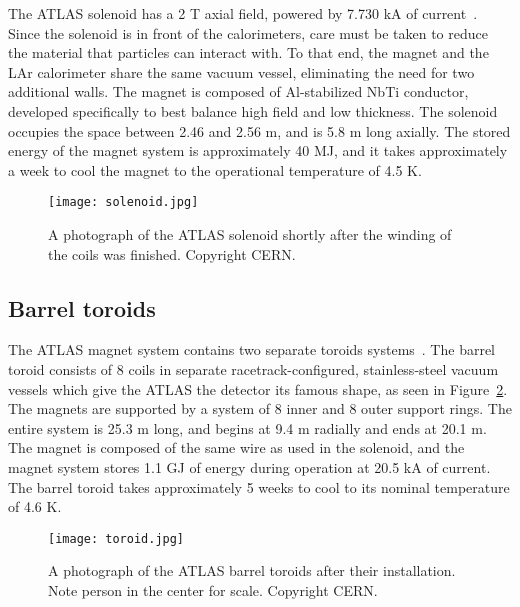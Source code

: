 The ATLAS solenoid has a 2 T axial field, powered by 7.730 kA of current~\cite{ATLASPaper}. Since the solenoid is in front of the calorimeters, care must be taken to reduce the material that particles can interact with. To that end, the magnet and the LAr calorimeter share the same vacuum vessel, eliminating the need for two additional walls. The magnet is composed of Al-stabilized NbTi conductor, developed specifically to best balance high field and low thickness. The solenoid occupies the space between 2.46 and 2.56 m, and is 5.8 m long axially. The stored energy of the magnet system is approximately 40 MJ, and it takes approximately a week to cool the magnet to the operational temperature of 4.5 K. 


\begin{figure}
\centering
\texttt{[image: solenoid.jpg]}
\label{fig:detector:solenoid}
\caption{A photograph of the ATLAS solenoid shortly after the winding of the coils was finished. Copyright CERN.}
\end{figure}



\subsection{Barrel toroids}

The ATLAS magnet system contains two separate toroids systems~\cite{ATLASPaper}. The barrel toroid consists of 8 coils in separate racetrack-configured, stainless-steel vacuum vessels which give the ATLAS the detector its famous shape, as seen in Figure~\ref{fig:detector:toroid}. The magnets are supported by a system of 8 inner and 8 outer support rings. The entire system is 25.3 m long, and begins at 9.4 m radially and ends at 20.1 m. The magnet is composed of the same wire as used in the solenoid, and the magnet system stores 1.1 GJ of energy during operation at 20.5 kA of current. The barrel toroid takes approximately 5 weeks to cool to its nominal temperature of 4.6 K.



\begin{figure}
\centering
\texttt{[image: toroid.jpg]}
\label{fig:detector:toroid}
\caption{A photograph of the ATLAS barrel toroids after their installation. Note person in the center for scale. Copyright CERN.}
\end{figure}


